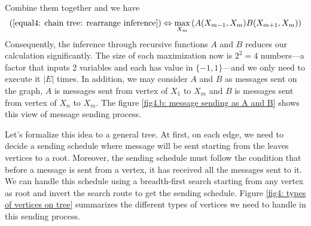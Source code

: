 Combine them together and we have
\begin{align}
	(\ref{equal4: chain tree: rearrange inference}) \Leftrightarrow \max_{X_m}{\left( 
		A(X_{m-1}, X_m) B(X_{m+1}, X_m) 
		\right)}
\end{align}
Consequently, the inference through recursive functions $A$ and $B$ reduces our calculation significantly. The size of each maximization now is $2^2 = 4$ numbers---a factor that inputs 2 variables and each has value in $\{-1, 1\}$---and we only need to execute it $|E|$ times. In addition, we may consider $A$ and $B$ as messages sent on the graph, $A$ is messages sent from vertex of $X_1$ to $X_m$ and $B$ is messages sent from vertex of $X_n$ to $X_m$. The figure \ref{fig4.b: message sending as A and B} shows this view of message sending process. 

Let's formalize this idea to a general tree. At first, on each edge, we need to decide a sending schedule where message will be sent starting from the leaves vertices to a root. Moreover, the sending schedule must follow the condition that before a message is sent from a vertex, it has received all the messages sent to it. We can handle this schedule using a breadth-first search starting from any vertex as root and invert the search route to get the sending schedule. Figure \ref{fig4: types of vertices on tree} summarizes the different types of vertices we need to handle in this sending process.

